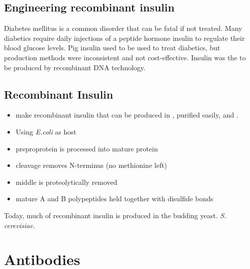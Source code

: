 \subsection{Engineering recombinant insulin}
Diabetes mellitus is a common disorder that can be fatal if not treated. Many diabetics require daily injections of a peptide hormone insulin to regulate their blood glucose levels. Pig insulin used to be used to treat diabetics, but production methods were inconsistent and not cost-effective. Insulin was the  to be produced by recombinant DNA technology.
\subsection{Recombinant Insulin}
\begin{itemize}
    \item make recombinant insulin that can be produced in , purified easily,  and .
    \item Using \textit{E.coli} as host
\end{itemize}
\begin{itemize}
    \item preproprotein is processed into mature protein
    \item cleavage removes N-terminus (no methionine left)
    \item middle is proteolytically removed
    \item mature A and B polypeptides held together with disulfide bonds
\end{itemize}
Today, much of recombinant insulin is produced in the budding yeast. \textit{S.} \textit{cerevisiae}.

\section{Antibodies}
